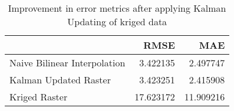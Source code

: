 \begin{table}
\caption{Improvement in error metrics after applying Kalman Updating of kriged data}
\label{tab:oahu5_gebco_raster_error}
\begin{tabular}{lrr}
\toprule
 & RMSE & MAE \\
\midrule
Naive Bilinear Interpolation & 3.422135 & 2.497747 \\
Kalman Updated Raster & 3.423251 & 2.415908 \\
Kriged Raster & 17.623172 & 11.909216 \\
\bottomrule
\end{tabular}
\end{table}
